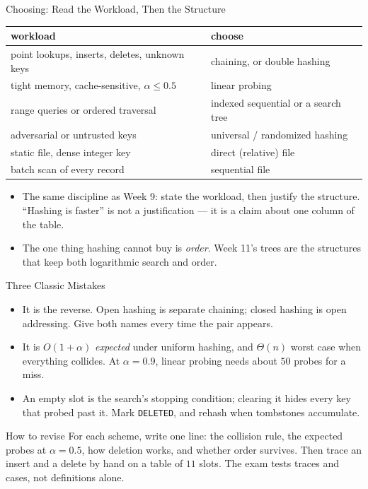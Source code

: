 \documentclass[aspectratio=169]{beamer}
\begin{document}
\begin{frame}{Choosing: Read the Workload, Then the Structure}
  \begin{center}
  {\footnotesize
  \begin{tabular}{p{6.4cm} p{5.4cm}}
    \toprule
    \textbf{workload} & \textbf{choose} \\
    \midrule
    point lookups, inserts, deletes, unknown keys & chaining, or double hashing \\
    tight memory, cache-sensitive, $\alpha \le 0.5$ & linear probing \\
    range queries or ordered traversal & indexed sequential or a search tree \\
    adversarial or untrusted keys & universal / randomized hashing \\
    static file, dense integer key & direct (relative) file \\
    batch scan of every record & sequential file \\
    \bottomrule
  \end{tabular}}
  \end{center}
  \begin{itemize}
    \item The same discipline as Week 9: state the workload, then justify the
      structure. ``Hashing is faster'' is not a justification --- it is a
      claim about one column of the table.
    \item The one thing hashing cannot buy is \emph{order}. Week 11's trees
      are the structures that keep both logarithmic search and order.
  \end{itemize}
\end{frame}

\begin{frame}{Three Classic Mistakes}
  \begin{itemize}
    \item {} It is the reverse.
      Open hashing is separate chaining; closed hashing is open addressing.
      Give both names every time the pair appears.
    \item {} It is
      $O(1+\alpha)$ \emph{expected} under uniform hashing, and $\Theta(n)$
      worst case when everything collides. At $\alpha=0.9$, linear probing
      needs about $50$ probes for a miss.
    \item {} An empty slot is the search's
      stopping condition; clearing it hides every key that probed past it.
      Mark \texttt{DELETED}, and rehash when tombstones accumulate.
  \end{itemize}
  \begin{exampleblock}{How to revise}
    For each scheme, write one line: the collision rule, the expected probes
    at $\alpha=0.5$, how deletion works, and whether order survives. Then
    trace an insert and a delete by hand on a table of $11$ slots. The exam
    tests traces and cases, not definitions alone.
  \end{exampleblock}
\end{frame}
\end{document}
